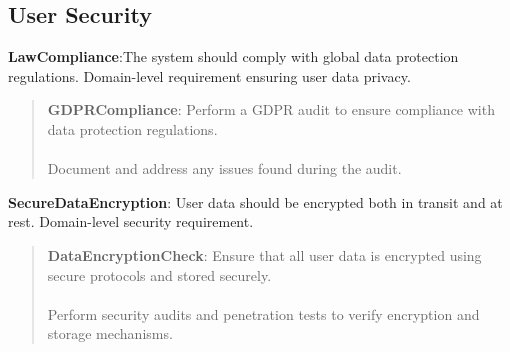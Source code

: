 \subsection{User Security}
\textbf{LawCompliance}:The system should comply with global data protection regulations. Domain-level requirement ensuring user data privacy.
\begin{quote}
    \textbf{GDPRCompliance}: Perform a GDPR audit to ensure compliance with data protection regulations. \\ \\
    Document and address any issues found during the audit.
\end{quote}
\textbf{SecureDataEncryption}: User data should be encrypted both in transit and at rest. Domain-level security requirement.
\begin{quote}
    \textbf{DataEncryptionCheck}: Ensure that all user data is encrypted using secure protocols and stored securely. \\ \\
    Perform security audits and penetration tests to verify encryption and storage mechanisms.
\end{quote}

